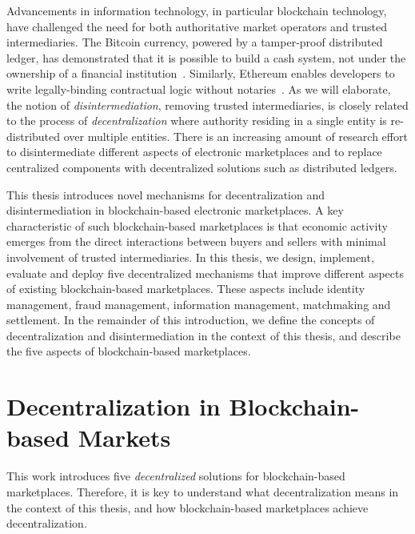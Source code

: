 Advancements in information technology, in particular blockchain technology, have challenged the need for both authoritative market operators and trusted intermediaries.
The Bitcoin currency, powered by a tamper-proof distributed ledger, has demonstrated that it is possible to build a cash system, not under the ownership of a financial institution~\cite{nakamoto2008bitcoin}.
Similarly, Ethereum enables developers to write legally-binding contractual logic without notaries~\cite{wood2014ethereum}.
As we will elaborate, the notion of \emph{disintermediation}, removing trusted intermediaries, is closely related to the process of \emph{decentralization} where authority residing in a single entity is re-distributed over multiple entities.
There is an increasing amount of research effort to disintermediate different aspects of electronic marketplaces and to replace centralized components with decentralized solutions such as distributed ledgers.

This thesis introduces novel mechanisms for decentralization and disintermediation in blockchain-based electronic marketplaces.
A key characteristic of such blockchain-based marketplaces is that economic activity emerges from the direct interactions between buyers and sellers with minimal involvement of trusted intermediaries.
In this thesis, we design, implement, evaluate and deploy five decentralized mechanisms that improve different aspects of existing blockchain-based marketplaces.
These aspects include identity management, fraud management, information management, matchmaking and settlement.
In the remainder of this introduction, we define the concepts of decentralization and disintermediation in the context of this thesis, and describe the five aspects of blockchain-based marketplaces.

\section{Decentralization in Blockchain-based Markets}
\label{sec:decentralization}
This work introduces five \emph{decentralized} solutions for blockchain-based marketplaces.
Therefore, it is key to understand what decentralization means in the context of this thesis, and how blockchain-based marketplaces achieve decentralization.

